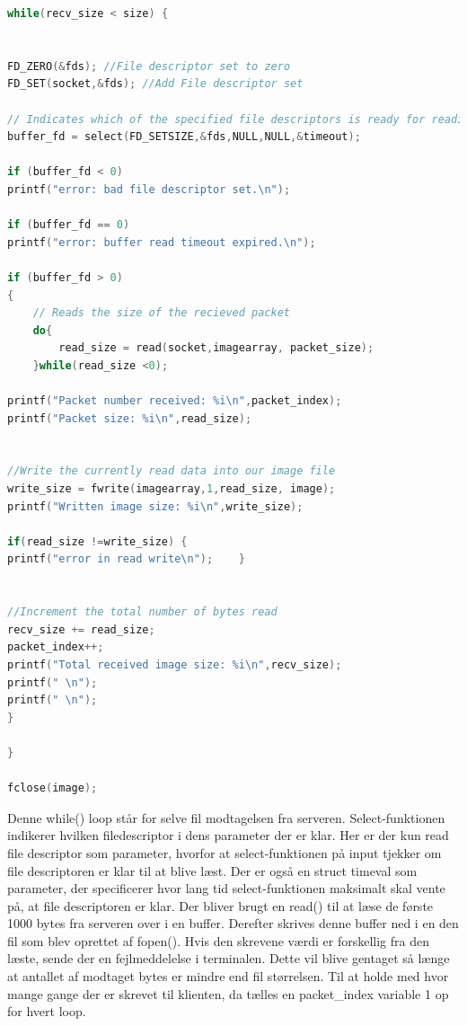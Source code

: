 \documentclass[12pt,fleqn,a4paper]{report}
\begin{document}
\begin{framed}
\begin{lstlisting}[language=C++]
while(recv_size < size) {
	
	
FD_ZERO(&fds); //File descriptor set to zero
FD_SET(socket,&fds); //Add File descriptor set
	
// Indicates which of the specified file descriptors is ready for reading, writing, or has an error condition pending
buffer_fd = select(FD_SETSIZE,&fds,NULL,NULL,&timeout);
	
if (buffer_fd < 0)
printf("error: bad file descriptor set.\n");
	
if (buffer_fd == 0)
printf("error: buffer read timeout expired.\n");
	
if (buffer_fd > 0)
{
	// Reads the size of the recieved packet
	do{
		read_size = read(socket,imagearray, packet_size);
	}while(read_size <0);
	
printf("Packet number received: %i\n",packet_index);
printf("Packet size: %i\n",read_size);
	
	
//Write the currently read data into our image file
write_size = fwrite(imagearray,1,read_size, image);
printf("Written image size: %i\n",write_size);

if(read_size !=write_size) {
printf("error in read write\n");    }
	
	
//Increment the total number of bytes read
recv_size += read_size;
packet_index++;
printf("Total received image size: %i\n",recv_size);
printf(" \n");
printf(" \n");
}

}

fclose(image);
\end{lstlisting}
\end{framed}

Denne while() loop står for selve fil modtagelsen fra serveren. Select-funktionen indikerer hvilken filedescriptor i dens parameter der er klar. Her er der kun read file descriptor som parameter, hvorfor at select-funktionen på input tjekker om file descriptoren er klar til at blive læst. 
Der er også en struct timeval som parameter, der specificerer hvor lang tid select-funktionen maksimalt skal vente på, at file descriptoren er klar.
Der bliver brugt en read() til at læse de første 1000 bytes fra serveren over i en buffer. Derefter skrives denne buffer ned i en den fil som blev oprettet af fopen(). Hvis den skrevene værdi er forskellig fra den læste, sende der en fejlmeddelelse i terminalen. Dette vil blive gentaget så længe at antallet af modtaget bytes er mindre end fil størrelsen.
Til at holde med hvor mange gange der er skrevet til klienten, da tælles en packet\_index variable 1 op for hvert loop.
\end{document}
